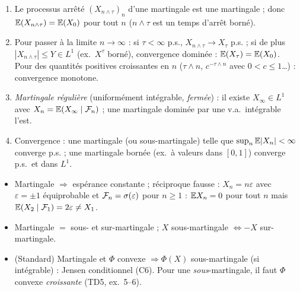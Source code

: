 \documentclass[11pt,a4paper]{article}
\begin{document}
\begin{horscours}\label{C8:nonborne}\leavevmode
\begin{enumerate}
  \item Le processus arrêté $(X_{n\wedge\tau})_n$ d'une martingale est une martingale ; donc $\mathbb{E}(X_{n\wedge\tau})=\mathbb{E}(X_0)$ pour tout $n$
  ($n\wedge\tau$ est un temps d'arrêt borné).
  \item Pour passer à la limite $n\to\infty$ : si $\tau<\infty$ p.s., $X_{n\wedge\tau}\to X_\tau$ p.s. ; si de plus
  $|X_{n\wedge\tau}|\le Y\in L^1$ (ex.\ $X^\tau$ borné), convergence dominée : $\mathbb{E}(X_\tau)=\mathbb{E}(X_0)$.
  Pour des quantités positives croissantes en $n$ ($\tau\wedge n$, $c^{-\tau\wedge n}$ avec $0<c\le1$…) : convergence monotone.
  \item \emph{Martingale régulière} (uniformément intégrable, \emph{fermée}) : il existe $X_\infty\in L^1$ avec $X_n=\mathbb{E}(X_\infty\mid\mathcal{F}_n)$ ;
  une martingale dominée par une v.a.\ intégrable l'est.
  \item Convergence : une martingale (ou sous-martingale) telle que $\sup_n\mathbb{E}|X_n|<\infty$ converge p.s. ; une martingale bornée
  (ex.\ à valeurs dans $[0,1]$) converge p.s.\ et dans $L^1$.
\end{enumerate}
\end{horscours}

\begin{liens}
\begin{itemize}
  \item Martingale $\Rightarrow$ espérance constante ; réciproque fausse : $X_n=n\varepsilon$ avec $\varepsilon=\pm1$ équiprobable
  et $\mathcal{F}_n=\sigma(\varepsilon)$ pour $n\ge1$ : $\mathbb{E} X_n=0$ pour tout $n$ mais $\mathbb{E}(X_2\mid\mathcal{F}_1)=2\varepsilon\neq X_1$.
  \item Martingale $=$ sous- et sur-martingale ; $X$ sous-martingale $\iff-X$ sur-martingale.
  \item (Standard) Martingale et $\Phi$ convexe $\Rightarrow\Phi(X)$ sous-martingale (si intégrable) : Jensen conditionnel (C6). Pour une \emph{sous}-martingale, il faut $\Phi$ convexe \emph{croissante} (TD5, ex.~5--6).
\end{itemize}
\end{liens}
\end{document}
